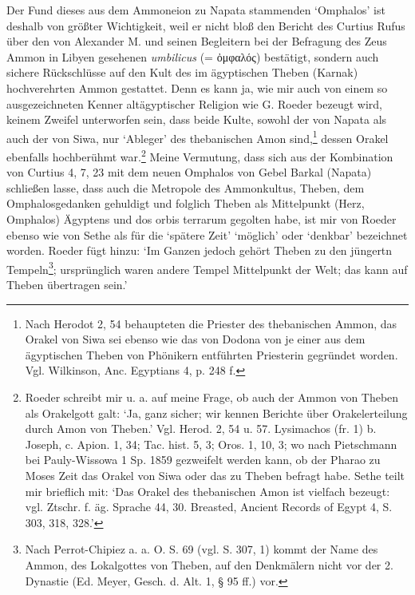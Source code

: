 \documentclass[a4paper, 11pt, oneside]{article}
\begin{document}
Der Fund dieses aus dem Ammoneion zu Napata stammenden `Omphalos' ist deshalb von größter Wichtigkeit, weil er nicht bloß den Bericht des Curtius Rufus über den von Alexander M. und seinen Begleitern bei der Befragung des Zeus Ammon in Libyen gesehenen \emph{umbilicus} (= ὀμφαλός) bestätigt, sondern auch sichere Rückschlüsse auf den Kult des im ägyptischen Theben (Karnak) hochverehrten Ammon gestattet. Denn es kann ja, wie mir auch von einem so ausgezeichneten Kenner altägyptischer Religion wie G. Roeder bezeugt wird, keinem Zweifel unterworfen sein, dass beide Kulte, sowohl der von Napata als auch der von Siwa, nur `Ableger' des thebanischen Amon sind,\footnote{Nach Herodot 2, 54 behaupteten die Priester des thebanischen Ammon, das Orakel von Siwa sei ebenso wie das von Dodona von je einer aus dem ägyptischen Theben von Phönikern entführten Priesterin gegründet worden. Vgl. Wilkinson, Anc. Egyptians 4, p. 248 f.} dessen Orakel ebenfalls hochberühmt war.\footnote{Roeder schreibt mir u. a. auf meine Frage, ob auch der Ammon von Theben als Orakelgott galt: `Ja, ganz sicher; wir kennen Berichte über Orakelerteilung durch Amon von Theben.' Vgl. Herod. 2, 54 u. 57. Lysimachos (fr. 1) b. Joseph, c. Apion. 1, 34; Tac. hist. 5, 3; Oros. 1, 10, 3; wo nach Pietschmann bei Pauly-Wissowa 1 Sp. 1859 gezweifelt werden kann, ob der Pharao zu Moses Zeit das Orakel von Siwa oder das zu Theben befragt habe. Sethe teilt mir brieflich mit: `Das Orakel des thebanischen Amon ist vielfach bezeugt: vgl. Ztschr. f. äg. Sprache 44, 30. Breasted, Ancient Records of Egypt 4, S. 303, 318, 328.'} Meine Vermutung, dass sich aus der Kombination von Curtius 4, 7, 23 mit dem neuen Omphalos von Gebel Barkal (Napata) schließen lasse, dass auch die Metropole des Ammonkultus, Theben, dem Omphalosgedanken gehuldigt und folglich Theben als Mittelpunkt (Herz, Omphalos) Ägyptens und dos orbis terrarum gegolten habe, ist mir von Roeder ebenso wie von Sethe als für die `spätere Zeit' `möglich' oder `denkbar' bezeichnet worden. Roeder fügt hinzu: `Im Ganzen jedoch gehört Theben zu den jüngertn Tempeln\footnote{Nach Perrot-Chipiez a. a. O. S. 69 (vgl. S. 307, 1) kommt der Name des Ammon, des Lokalgottes von Theben, auf den Denkmälern nicht vor der 2. Dynastie (Ed. Meyer, Gesch. d. Alt. 1, § 95 ff.) vor.}; ursprünglich waren andere Tempel Mittelpunkt der Welt; das kann auf Theben übertragen sein.'
\end{document}
